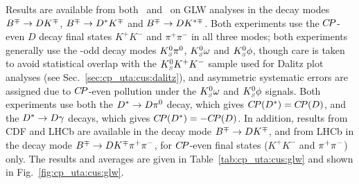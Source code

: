 \label{sec:cp_uta:cus:glw}

Results are available from both \babar\ and \belle\ on GLW analyses in the
decay modes $B^\mp \to DK^\mp$, $B^\mp \to D^*K^\mp$ and 
$B^\mp \to DK^{*\mp}$.
Both experiments use the $C\!P$-even $D$ decay final states $K^+K^-$ and
$\pi^+\pi^-$ in all three modes; both experiments generally use the \CP-odd
decay modes $K^0_{\scriptscriptstyle S}\pi^0$, $K^0_{\scriptscriptstyle S}\omega$ and $K^0_{\scriptscriptstyle S}\phi$, though care is taken to
avoid statistical overlap with the $K^0_{\scriptscriptstyle S} K^+K^-$ sample used for Dalitz plot
analyses (see Sec.~\ref{sec:cp_uta:cus:dalitz}), 
and asymmetric systematic errors are assigned due to $C\!P$-even pollution
under the $K^0_{\scriptscriptstyle S}\omega$ and $K^0_{\scriptscriptstyle S}\phi$ signals.
Both experiments use both the $D^* \to D\pi^0$ decay, 
which gives $C\!P(D^*) = C\!P(D)$,
and the $D^* \to D\gamma$ decays, 
which gives $C\!P(D^*) = -C\!P(D)$.
In addition, results from CDF and LHCb are available in the
decay mode $B^\mp \to DK^\mp$, 
and from LHCb in the decay mode $B^\mp \to DK^\mp\pi^+\pi^-$, 
for $C\!P$-even final states ($K^+K^-$ and $\pi^+\pi^-$) only.
The results and averages are given in Table~\ref{tab:cp_uta:cus:glw}
and shown in Fig.~\ref{fig:cp_uta:cus:glw}.



